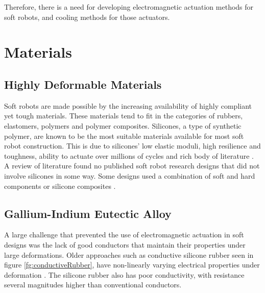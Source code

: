 \documentclass[a4paper,12pt]{article}
\begin{document}
Therefore, there is a need for developing electromagnetic actuation methods for soft robots, and cooling methods for those actuators.

\section{Materials}

\subsection{Highly Deformable Materials}
Soft robots are made possible by the increasing availability of highly compliant yet tough materials. These materials tend to fit in the categories of rubbers, elastomers, polymers and polymer composites. Silicones, a type of synthetic polymer, are known to be the most suitable materials available for most soft robot construction. This is due to silicones’ low elastic moduli, high resilience and toughness, ability to actuate over millions of cycles and rich body of literature \cite{polygerinosSoftRoboticsReview2017}. A review of literature found no published soft robot research designs that did not involve silicones in some way. Some designs used a combination of soft and hard components \cite{stokesHybridCombiningHard2013} or silicone composites \cite{laschiSoftRobotArm2012}.

\subsection{Gallium-Indium Eutectic Alloy}
A large challenge that prevented the use of electromagnetic actuation in soft designs was the lack of good conductors that maintain their properties under large deformations. Older approaches such as conductive silicone rubber seen in figure \ref{fg:conductiveRubber}, have non-linearly varying electrical properties under deformation \cite{valentaMechanicalElectricalTesting2008}. The silicone rubber also has poor conductivity, with resistance several magnitudes higher than conventional conductors.
\end{document}
